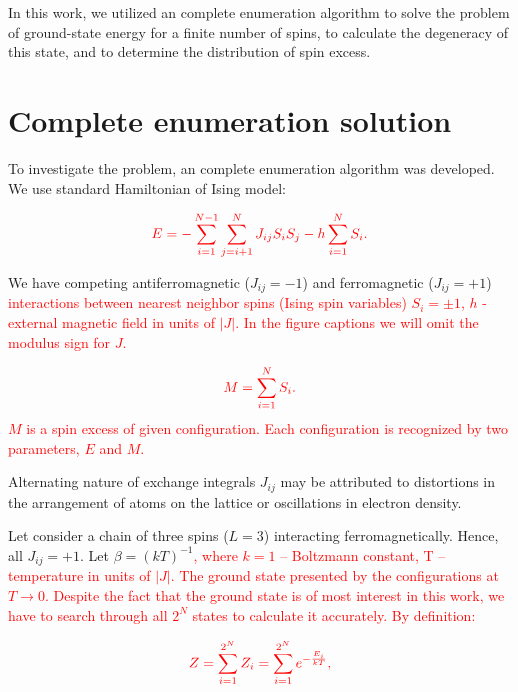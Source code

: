 \documentclass[preprint,12pt]{elsarticle}
\begin{document}
	In this work, we utilized an complete enumeration algorithm \cite{dias2023ground, padalko2021parallel} to solve the problem of ground-state energy for a finite number of spins, to calculate the degeneracy of this state, and to determine the distribution of spin excess.
	
	\section{Complete enumeration solution}
	
	To investigate the problem, an complete enumeration algorithm was developed. We use standard Hamiltonian of Ising model:
	
	\begin{equation}
		\color{red}
		E = -\sum^{N - 1}_{i=1}\sum^N_{j = i + 1} J_{ij} S_i S_j - h \sum^N_{i=1} S_i.
		\label{eq:ising_energy}
	\end{equation}
	
	We have competing antiferromagnetic ($J_{ij} = -1$) and ferromagnetic ($J_{ij} = +1$) \textcolor{red}{interactions between nearest neighbor spins (Ising spin variables) $S_i = \pm1$, $h$ - external magnetic field in units of $|J|$. 
	In the figure captions we will omit the modulus sign for $J$.} 
	
	\begin{equation}
		\color{red}
		M = \sum^N_{i=1} S_i.
		\label{eq:spin_excess} 
	\end{equation}
	\textcolor{red}{$M$ is a spin excess of given configuration. Each configuration is recognized by two parameters, $E$ and $M$.}
	
	
	Alternating nature of exchange integrals $J_{ij}$ may be attributed to distortions in the arrangement of atoms on the lattice or oscillations in electron density.
	
	Let consider a chain of three spins ($L = 3$) interacting ferromagnetically. Hence, all $J_{ij} = +1$. Let $\beta = (kT)^{-1}$\textcolor{red}{, where $k = 1$ -- Boltzmann constant, T -- temperature in units of $|J|$. The ground state presented by the configurations at $T \rightarrow 0$. Despite the fact that the ground state is of most interest in this work, we have to search through all $2^N$ states to calculate it accurately. By definition:}
	
	\begin{equation}
		\color{red}
		Z = \sum_{i = 1}^{2 ^ N} Z_i = \sum_{i = 1}^{2 ^ N} e^{-\frac{E_i}{kT}},
		\label{eq:stat_difinition}
	\end{equation}
	
\end{document}

